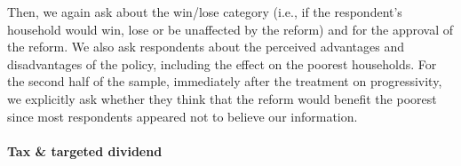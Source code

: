 \documentclass[12pt]{article} %
\begin{document}

Then, we again ask about the win/lose category (i.e., if the respondent's household would win, lose or be unaffected by the reform) and for the approval of the reform. We also ask respondents about the perceived advantages and disadvantages of the policy, including the effect on the poorest households. For the second half of the sample, immediately after the treatment on progressivity, we explicitly ask whether they think that the reform would benefit the poorest since most respondents appeared not to believe our information. %



\paragraph{Tax \& targeted dividend}

\end{document}
